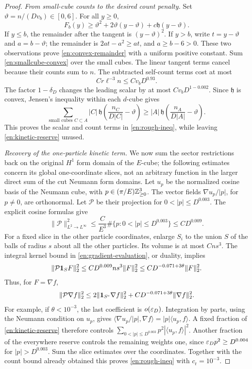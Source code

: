 \begin{proof}
\emph{From small-cube counts to the desired count penalty.}
Set \(\vartheta=n/(Dv_b)\in[0,6]\).  For all \(y\ge0\),
\begin{equation}\label{en:convex-remainder}
 F_b(y)\ge\vartheta^2+2\vartheta(y-\vartheta)
                         +c\mathfrak h(y-\vartheta).
\end{equation}
If \(y\le b\), the remainder after the tangent is
\((y-\vartheta)^2\).  If \(y>b\), write
\(t=y-\vartheta\) and \(a=b-\vartheta\); the remainder is
\(2at-a^2\ge at\), and \(a\ge b-6>0\).
These two observations prove \eqref{en:convex-remainder} with a
uniform positive constant.  Sum \eqref{en:smallcube-convex} over the
small cubes.  The linear tangent terms cancel because their counts sum
to \(n\).  The subtracted self-count terms cost at most
\[
 C r\ell^{-3}n\le Cv_bD^{0.93}.
\]
The factor \(1-\delta_D\) changes the leading scalar by at most
\(Cv_bD^{1-0.002}\).  Since \(\mathfrak h\) is convex, Jensen's
inequality within each \(d\)-cube gives
\[
 \sum_{\text{small cubes }C\subset A}|C|\,
   \mathfrak h\left(\frac{n_C}{D|C|}-\vartheta\right)
 \ge |A|\,\mathfrak h\left(\frac{n_A}{D|A|}-\vartheta\right).
\]
This proves the scalar and count terms in \eqref{en:rough-ineq},
while leaving \eqref{en:kinetic-reserve} unused.

\emph{Recovery of the one-particle kinetic term.}
We now sum the sector restrictions back on the original \(H^1\) form
domain of the \(E\)-cube; the following estimates concern its global
one-coordinate slices, not an arbitrary function in the larger direct
sum of the cut Neumann form domains.
Let \(u_p\) be the normalized cosine basis of the Neumann cube, with
\(p\in(\pi/E)\mathbb Z_{\ge0}^3\).  The vector fields
\(\nabla u_p/|p|\), for \(p\ne0\), are orthonormal.  Let
\(\mathcal P\) be their projection for
\(0<|p|\le D^{0.003}\).  The explicit cosine formulas give
\begin{equation}\label{en:gradient-evaluation}
 \|\mathcal P\|_{L^2\to L^\infty}^2
 \le\frac{C}{E^3}\#\{p:0<|p|\le D^{0.003}\}
 \le CD^{0.009}.
\end{equation}
For a fixed slice in the other particle coordinates, enlarge \(S_i\)
to the union \(S\) of the balls of radius \(s\) about all the other
particles.  Its volume is at most \(Cns^3\).  The integral kernel
bound in \eqref{en:gradient-evaluation}, or duality, implies
\[
 \|\mathcal P\mathbf 1_S F\|_2^2
       \le CD^{0.009}ns^3\|F\|_2^2
       \le CD^{-0.071+3\theta}\|F\|_2^2.
\]
Thus, for \(F=\nabla f\),
\[
 \|\mathcal P\nabla f\|_2^2
 \le2\|\mathbf 1_{S^c}\nabla f\|_2^2
                +CD^{-0.071+3\theta}\|\nabla f\|_2^2.
\]
For example, if \(\theta<10^{-3}\), the last coefficient is
\(o(\varepsilon_D)\).  Integration by parts, using the Neumann condition on
\(u_p\), gives
\(\langle\nabla u_p/|p|,\nabla f\rangle
   =|p|\langle u_p,f\rangle\).
A fixed fraction of
\eqref{en:kinetic-reserve} therefore controls
\(\sum_{0<|p|\le D^{0.003}}p^2|\langle u_p,f\rangle|^2\).
Another fraction of the everywhere reserve controls the remaining
weights one, since
\(\varepsilon_Dp^2\ge D^{0.004}\) for \(|p|>D^{0.003}\).
Sum the slice estimates over the coordinates.  Together with the count
bound already obtained this proves \eqref{en:rough-ineq} with
\(c_{\mathrm r}=10^{-3}\).
\end{proof}


